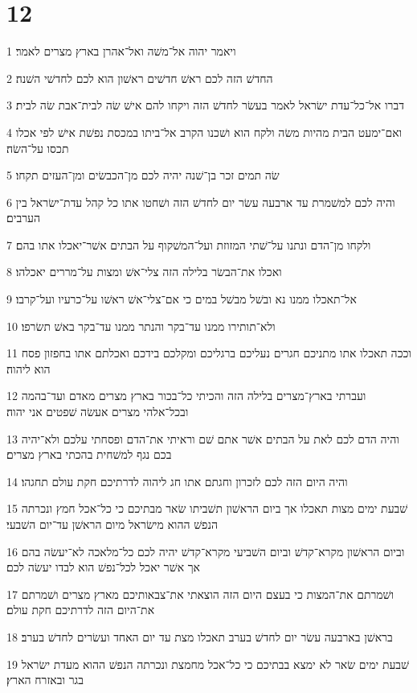 \chapter{12}

\par 1 ויאמר יהוה אל־משׁה ואל־אהרן בארץ מצרים לאמר׃
\par 2 החדשׁ הזה לכם ראשׁ חדשׁים ראשׁון הוא לכם לחדשׁי השׁנה׃
\par 3 דברו אל־כל־עדת ישׂראל לאמר בעשׂר לחדשׁ הזה ויקחו להם אישׁ שׂה לבית־אבת שׂה לבית׃
\par 4 ואם־ימעט הבית מהיות משׂה ולקח הוא ושׁכנו הקרב אל־ביתו במכסת נפשׁת אישׁ לפי אכלו תכסו על־השׂה׃
\par 5 שׂה תמים זכר בן־שׁנה יהיה לכם מן־הכבשׂים ומן־העזים תקחו׃
\par 6 והיה לכם למשׁמרת עד ארבעה עשׂר יום לחדשׁ הזה ושׁחטו אתו כל קהל עדת־ישׂראל בין הערבים׃
\par 7 ולקחו מן־הדם ונתנו על־שׁתי המזוזת ועל־המשׁקוף על הבתים אשׁר־יאכלו אתו בהם׃
\par 8 ואכלו את־הבשׂר בלילה הזה צלי־אשׁ ומצות על־מררים יאכלהו׃
\par 9 אל־תאכלו ממנו נא ובשׁל מבשׁל במים כי אם־צלי־אשׁ ראשׁו על־כרעיו ועל־קרבו׃
\par 10 ולא־תותירו ממנו עד־בקר והנתר ממנו עד־בקר באשׁ תשׂרפו׃
\par 11 וככה תאכלו אתו מתניכם חגרים נעליכם ברגליכם ומקלכם בידכם ואכלתם אתו בחפזון פסח הוא ליהוה׃
\par 12 ועברתי בארץ־מצרים בלילה הזה והכיתי כל־בכור בארץ מצרים מאדם ועד־בהמה ובכל־אלהי מצרים אעשׂה שׁפטים אני יהוה׃
\par 13 והיה הדם לכם לאת על הבתים אשׁר אתם שׁם וראיתי את־הדם ופסחתי עלכם ולא־יהיה בכם נגף למשׁחית בהכתי בארץ מצרים׃
\par 14 והיה היום הזה לכם לזכרון וחגתם אתו חג ליהוה לדרתיכם חקת עולם תחגהו׃
\par 15 שׁבעת ימים מצות תאכלו אך ביום הראשׁון תשׁביתו שׂאר מבתיכם כי כל־אכל חמץ ונכרתה הנפשׁ ההוא מישׂראל מיום הראשׁן עד־יום השׁבעי׃
\par 16 וביום הראשׁון מקרא־קדשׁ וביום השׁביעי מקרא־קדשׁ יהיה לכם כל־מלאכה לא־יעשׂה בהם אך אשׁר יאכל לכל־נפשׁ הוא לבדו יעשׂה לכם׃
\par 17 ושׁמרתם את־המצות כי בעצם היום הזה הוצאתי את־צבאותיכם מארץ מצרים ושׁמרתם את־היום הזה לדרתיכם חקת עולם׃
\par 18 בראשׁן בארבעה עשׂר יום לחדשׁ בערב תאכלו מצת עד יום האחד ועשׂרים לחדשׁ בערב׃
\par 19 שׁבעת ימים שׂאר לא ימצא בבתיכם כי כל־אכל מחמצת ונכרתה הנפשׁ ההוא מעדת ישׂראל בגר ובאזרח הארץ׃
